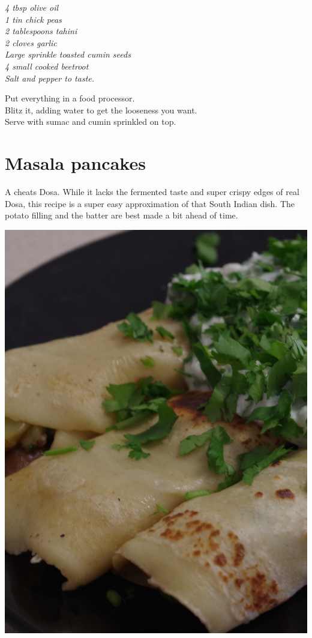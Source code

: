 \documentclass{tufte-book}
\begin{document}
\smallskip
\emph{4 tbsp olive oil
\\1 tin chick peas
\\2 tablespoons tahini
\\2 cloves garlic
\\Large sprinkle toasted cumin seeds
\\4 small cooked beetroot
\\Salt and pepper to taste.
}

\smallskip
Put everything in a food processor.
\\Blitz it, adding water to get the looseness you want. 
\\Serve with sumac and cumin sprinkled on top.

\section{Masala pancakes}

A cheats Dosa. While it lacks the fermented taste and super crispy edges of real Dosa, this recipe is a super easy approximation of that South Indian dish. The potato filling and the batter are best made a bit ahead of time.

\begin{marginfigure}%
  \includegraphics[width=\linewidth]{masalapancakes.png}
\end{marginfigure}
\end{document}

